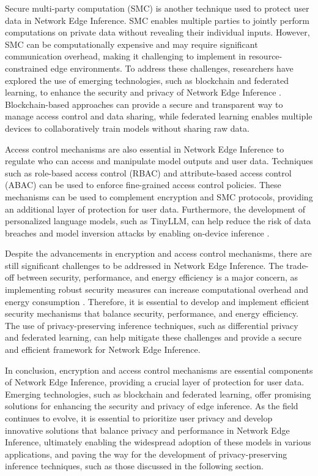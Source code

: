\documentclass[11pt,a4paper]{article}
\begin{document}
Secure multi-party computation (SMC) is another technique used to protect user data in Network Edge Inference. SMC enables multiple parties to jointly perform computations on private data without revealing their individual inputs. However, SMC can be computationally expensive and may require significant communication overhead, making it challenging to implement in resource-constrained edge environments. To address these challenges, researchers have explored the use of emerging technologies, such as blockchain and federated learning, to enhance the security and privacy of Network Edge Inference \cite{arxiv:2405.14636}. Blockchain-based approaches can provide a secure and transparent way to manage access control and data sharing, while federated learning enables multiple devices to collaboratively train models without sharing raw data.

Access control mechanisms are also essential in Network Edge Inference to regulate who can access and manipulate model outputs and user data. Techniques such as role-based access control (RBAC) and attribute-based access control (ABAC) can be used to enforce fine-grained access control policies. These mechanisms can be used to complement encryption and SMC protocols, providing an additional layer of protection for user data. Furthermore, the development of personalized language models, such as TinyLLM, can help reduce the risk of data breaches and model inversion attacks by enabling on-device inference \cite{arxiv:2412.15304}.

Despite the advancements in encryption and access control mechanisms, there are still significant challenges to be addressed in Network Edge Inference. The trade-off between security, performance, and energy efficiency is a major concern, as implementing robust security measures can increase computational overhead and energy consumption \cite{arxiv:2401.15024}. Therefore, it is essential to develop and implement efficient security mechanisms that balance security, performance, and energy efficiency. The use of privacy-preserving inference techniques, such as differential privacy and federated learning, can help mitigate these challenges and provide a secure and efficient framework for Network Edge Inference.

In conclusion, encryption and access control mechanisms are essential components of Network Edge Inference, providing a crucial layer of protection for user data. Emerging technologies, such as blockchain and federated learning, offer promising solutions for enhancing the security and privacy of edge inference. As the field continues to evolve, it is essential to prioritize user privacy and develop innovative solutions that balance privacy and performance in Network Edge Inference, ultimately enabling the widespread adoption of these models in various applications, and paving the way for the development of privacy-preserving inference techniques, such as those discussed in the following section.
\end{document}
